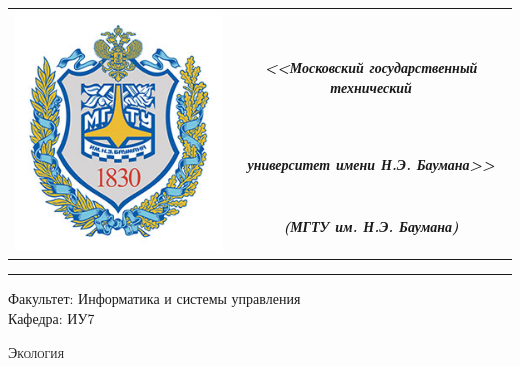 \begin{titlepage}

    \begin{table}[H]
        \centering
        \begin{tabular}{cc}
            \multirow{4}{*}{\includegraphics[scale=0.3]{../../bmstu.jpg}}
            & \\
            & \large \textit{\textbf{<<Московский государственный технический}} \\
            & \large \textit{\textbf{университет имени Н.Э. Баумана>>}}\\
            & \large \textit{\textbf{(МГТУ им. Н.Э. Баумана)}}\\
        \end{tabular}
    \end{table}

    \begin{flushleft}
        \rule{\textwidth}{3pt}
    \end{flushleft}

    \begin{flushleft}
        \Large
        Факультет: Информатика и системы управления \\
        Кафедра: ИУ7
    \end{flushleft}

    \vspace{2cm}

    \begin{center}
        \LARGE
        \textsc{Экология}
    \end{center}

    \vspace{3cm}

    \begin{center}
        \large


\end{center}
\end{titlepage}
